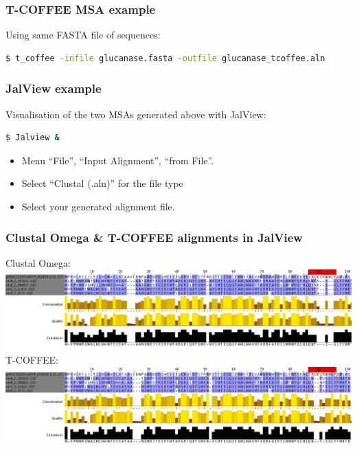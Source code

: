 \begin{frame}[fragile]
\frametitle{T-COFFEE MSA example}
Using same FASTA file of sequences:
\begin{lstlisting}[language=bash]
$ t_coffee -infile glucanase.fasta -outfile glucanase_tcoffee.aln
\end{lstlisting}
\end{frame}

\begin{frame}[fragile]
\frametitle{JalView example}
Visualisation of the two MSAs generated above with JalView:
\begin{lstlisting}[language=bash]
$ Jalview &
\end{lstlisting}
\begin{itemize}
\item Menu ``File'', ``Input Alignment'', ``from File''.
\item Select ``Clustal (.aln)'' for the file type
\item Select your generated alignment file.
\end{itemize}
\end{frame}

\begin{frame}[fragile]
\frametitle{Clustal Omega \& T-COFFEE alignments in JalView}
\begin{center}
Clustal Omega: \\
\includegraphics[width=\textwidth]{images/glucanase_clustalo.png} \\
T-COFFEE: \\
\includegraphics[width=\textwidth]{images/glucanase_tcoffee.png}
\end{center}
\end{frame}

